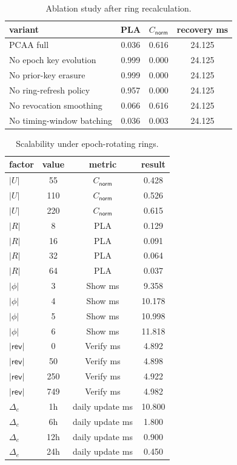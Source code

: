 \begin{table}[htbp]
\centering
\caption{Ablation study after ring recalculation.}
\label{tab:ablation}
\begin{tabular}{@{}lccc@{}}
\toprule
variant & PLA & $C_{\mathsf{norm}}$ & recovery ms \\
\midrule
PCAA full & 0.036 & 0.616 & 24.125 \\
No epoch key evolution & 0.999 & 0.000 & 24.125 \\
No prior-key erasure & 0.999 & 0.000 & 24.125 \\
No ring-refresh policy & 0.957 & 0.000 & 24.125 \\
No revocation smoothing & 0.066 & 0.616 & 24.125 \\
No timing-window batching & 0.036 & 0.003 & 24.125 \\
\bottomrule
\end{tabular}
\end{table}


\begin{table}[htbp]
\centering
\caption{Scalability under epoch-rotating rings.}
\label{tab:scalability}
\begin{tabular}{@{}lccc@{}}
\toprule
factor & value & metric & result \\
\midrule
$|U|$ & 55 & $C_{\mathsf{norm}}$ & 0.428 \\
$|U|$ & 110 & $C_{\mathsf{norm}}$ & 0.526 \\
$|U|$ & 220 & $C_{\mathsf{norm}}$ & 0.615 \\
$|R|$ & 8 & PLA & 0.129 \\
$|R|$ & 16 & PLA & 0.091 \\
$|R|$ & 32 & PLA & 0.064 \\
$|R|$ & 64 & PLA & 0.037 \\
$|\phi|$ & 3 & Show ms & 9.358 \\
$|\phi|$ & 4 & Show ms & 10.178 \\
$|\phi|$ & 5 & Show ms & 10.998 \\
$|\phi|$ & 6 & Show ms & 11.818 \\
$|\mathsf{rev}|$ & 0 & Verify ms & 4.892 \\
$|\mathsf{rev}|$ & 50 & Verify ms & 4.898 \\
$|\mathsf{rev}|$ & 250 & Verify ms & 4.922 \\
$|\mathsf{rev}|$ & 749 & Verify ms & 4.982 \\
$\Delta_e$ & 1h & daily update ms & 10.800 \\
$\Delta_e$ & 6h & daily update ms & 1.800 \\
$\Delta_e$ & 12h & daily update ms & 0.900 \\
$\Delta_e$ & 24h & daily update ms & 0.450 \\
\bottomrule
\end{tabular}
\end{table}
